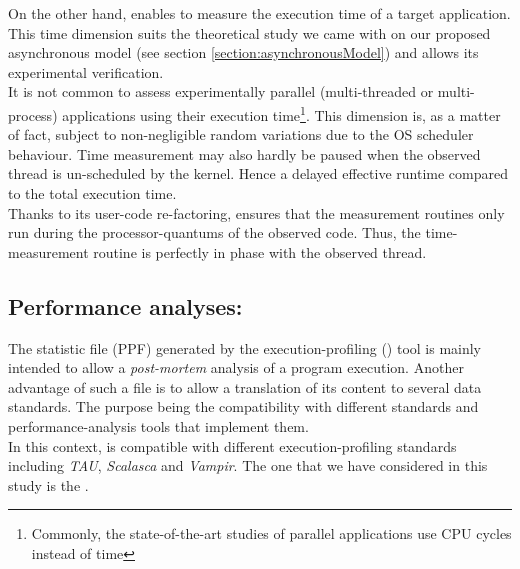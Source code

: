 		On the other hand, \toolProfiling\space enables to measure the execution time of a target application.   This time dimension suits the theoretical study we came with on our proposed asynchronous model (see section \ref{section:asynchronousModel}) and allows its experimental verification.\\
		It is not common to assess experimentally parallel (multi-threaded or multi-process) applications using their execution time\footnote{Commonly, the state-of-the-art studies of parallel applications use CPU cycles instead of time}.   This dimension is, as a matter of fact, subject to non-negligible random variations due to the OS scheduler behaviour.   Time measurement may also hardly be paused when the observed thread is un-scheduled by the kernel.   Hence a delayed effective runtime compared to the total execution time.\\
		Thanks to its user-code re-factoring, \toolProfiling\space ensures that the measurement routines only run during the processor-quantums of the observed code.   Thus, the time-measurement routine is perfectly in phase with the observed thread.

	\subsection{Performance analyses: \toolTraceAnalyzed}\label{subsection:traceAnalyses}
		The statistic file (PPF) generated by the execution-profiling (\toolProfiling) tool is mainly intended to allow a \emph{post-mortem} analysis of a program execution.   Another advantage of such a file is to allow a translation of its content to several data standards.   The purpose being the compatibility with different standards and performance-analysis tools that implement them.\\
		In this context, \toolProfiling\space is compatible with different execution-profiling standards including \emph{TAU}\cite{shende2006tau}, \emph{Scalasca}\cite{zhukov2013assessing} and \emph{Vampir}\cite{knupfer2008vampir}.   The one that we have considered in this study is the \toolTraceAnalyzed\cite{saviankou2015cube}.\\


